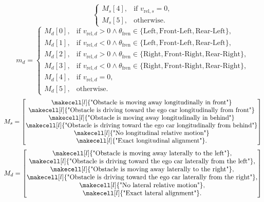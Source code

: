 \begin{itemize}
{\[\begin{cases}
    M_s[4], & \text{if } v_{\text{rel}, s} = 0, \\
    M_s[5], & \text{otherwise}.
    \end{cases}
\]
}
{\scriptsize
\[
    m_d =
    \begin{cases}
    M_d[0], & \text{if } v_{\text{rel}, d} > 0 \land \theta_{\text{fren}} \in \{\text{Left}, \text{Front-Left}, \text{Rear-Left}\}, \\
    M_d[1], & \text{if } v_{\text{rel}, d} < 0 \land \theta_{\text{fren}} \in \{\text{Left}, \text{Front-Left}, \text{Rear-Left}\}, \\
    M_d[2], & \text{if } v_{\text{rel}, d} > 0 \land \theta_{\text{fren}} \in \{\text{Right}, \text{Front-Right}, \text{Rear-Right}\}, \\
    M_d[3], & \text{if } v_{\text{rel}, d} < 0 \land \theta_{\text{fren}} \in \{\text{Right}, \text{Front-Right}, \text{Rear-Right}\}, \\
    M_d[4], & \text{if } v_{\text{rel}, d} = 0, \\
    M_d[5], & \text{otherwise}.
    \end{cases}
\]
}
{\scriptsize
\[
    M_s =
    \begin{bmatrix}
    \makecell[l]{\text{"Obstacle is moving away longitudinally in front"}} \\
    \makecell[l]{\text{"Obstacle is driving toward the ego car longitudinally from front"}} \\
    \makecell[l]{\text{"Obstacle is moving away longitudinally in behind"}} \\
    \makecell[l]{\text{"Obstacle is driving toward the ego car longitudinally from behind"}} \\
    \makecell[l]{\text{"No longitudinal relative motion"}} \\
    \makecell[l]{\text{"Exact longitudinal alignment"}}.
    \end{bmatrix}
\]
}
{\scriptsize
\[
    M_d =
    \begin{bmatrix}
     \makecell[l]{\text{"Obstacle is moving away laterally to the left"}}, \\
     \makecell[l]{\text{"Obstacle is driving toward the ego car laterally from the left"}}, \\
     \makecell[l]{\text{"Obstacle is moving away laterally to the right"}}, \\
     \makecell[l]{\text{"Obstacle is driving toward the ego car laterally from the right"}}, \\
     \makecell[l]{\text{"No lateral relative motion"}}, \\
     \makecell[l]{\text{"Exact lateral alignment"}}.
    \end{bmatrix}
\]
}


\end{itemize}

